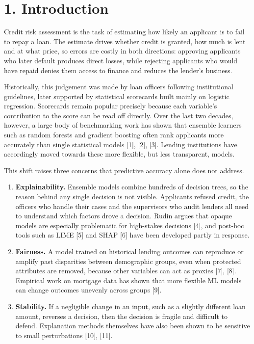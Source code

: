 \documentclass[
  11pt,
]{article}
\providecommand{\tightlist}{%
  \setlength{\itemsep}{0pt}\setlength{\parskip}{0pt}}
\begin{document}
\hypertarget{introduction}{%
\section{1. Introduction}\label{introduction}}

Credit risk assessment is the task of estimating how likely an applicant
is to fail to repay a loan. The estimate drives whether credit is
granted, how much is lent and at what price, so errors are costly in
both directions: approving applicants who later default produces direct
losses, while rejecting applicants who would have repaid denies them
access to finance and reduces the lender's business.

Historically, this judgement was made by loan officers following
institutional guidelines, later supported by statistical scorecards
built mainly on logistic regression. Scorecards remain popular precisely
because each variable's contribution to the score can be read off
directly. Over the last two decades, however, a large body of
benchmarking work has shown that ensemble learners such as random
forests and gradient boosting often rank applicants more accurately than
single statistical models {[}1{]}, {[}2{]}, {[}3{]}. Lending
institutions have accordingly moved towards these more flexible, but
less transparent, models.

This shift raises three concerns that predictive accuracy alone does not
address.

\begin{enumerate}
\def\labelenumi{\arabic{enumi}.}
\tightlist
\item
  \textbf{Explainability.} Ensemble models combine hundreds of decision
  trees, so the reason behind any single decision is not visible.
  Applicants refused credit, the officers who handle their cases and the
  supervisors who audit lenders all need to understand which factors
  drove a decision. Rudin argues that opaque models are especially
  problematic for high-stakes decisions {[}4{]}, and post-hoc tools such
  as LIME {[}5{]} and SHAP {[}6{]} have been developed partly in
  response.
\item
  \textbf{Fairness.} A model trained on historical lending outcomes can
  reproduce or amplify past disparities between demographic groups, even
  when protected attributes are removed, because other variables can act
  as proxies {[}7{]}, {[}8{]}. Empirical work on mortgage data has shown
  that more flexible ML models can change outcomes unevenly across
  groups {[}9{]}.
\item
  \textbf{Stability.} If a negligible change in an input, such as a
  slightly different loan amount, reverses a decision, then the decision
  is fragile and difficult to defend. Explanation methods themselves
  have also been shown to be sensitive to small perturbations {[}10{]},
  {[}11{]}.
\end{enumerate}
\end{document}
